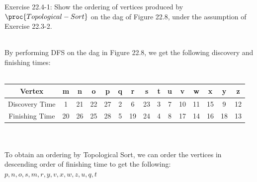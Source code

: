 \documentclass[addpoints,11pt]{exam}
\begin{document}
\begin{questions}
\ifprintanswers
\newpage
\else
\bigskip
\fi



\question[5]
Exercise 22.4-1: Show the ordering of vertices produced by $\proc{Topological-Sort}$ on the dag of Figure 22.8, under the assumption of Exercise 22.3-2.  
\begin{solutionorbox} \\ 
    By performing DFS on the dag in Figure 22.8, we get the following discovery and finishing times: \\ \\
    \begin{tabular}{c | c | c | c | c | c | c | c | c | c | c | c | c | c | c}
        Vertex & m & n & o & p & q & r & s & t & u & v & w & x & y & z \\
        \hline
        Discovery Time & 1 & 21 & 22 & 27 & 2 & 6 & 23 & 3 & 7 & 10 & 11 & 15 & 9 & 12 \\
        \hline
        Finishing Time & 20 & 26 & 25 & 28 & 5 & 19 & 24 & 4 & 8 & 17 & 14 & 16 & 18 & 13 
    \end{tabular} \\ \\
    To obtain an ordering by Topological Sort, we can order the vertices in descending order of finishing time to get the following: \\
    $p, n, o, s, m, r, y, v, x, w, z, u, q, t$
\end{solutionorbox}

\ifprintanswers
\newpage
\else
\bigskip
\fi




\end{questions}
\end{document}
